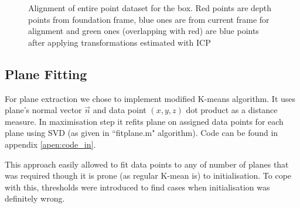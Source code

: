 \documentclass[12pt,a4paper,onecolumn]{article}
\begin{document}
\begin{figure}[!ht]	
    \centering
      \caption{Alignment of entire point dataset for the box. Red points are depth points from
      foundation frame, blue ones are from current frame for alignment and green ones (overlapping with red)
      are blue points after applying transformations estimated with ICP}
\end{figure}
\subsection{Plane Fitting}
For plane extraction we chose to implement modified K-means algorithm.
It uses plane's normal vector $\vec{n}$  and data point $ (x,y,z) $
dot product as a distance measure. In maximisation step it refits
plane on assigned data points for each plane
 using SVD (as given in ``fitplane.m"
algorithm). Code can be found in appendix \ref{apen:code_in}.

This approach easily allowed to fit data points to any of number of
planes that was required though it is prone (as regular K-mean is)
to initialisation. To cope with this, thresholds were introduced
to find cases when initialisation was definitely wrong.
\end{document}
